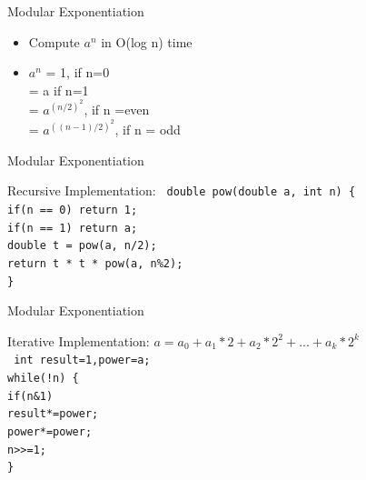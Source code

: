 \documentclass{beamer}
\begin{document}
\begin{frame}[<+->]{Modular Exponentiation}
\begin{itemize}
  \item Compute $a^n$ in O(log n) time
  \item $a^n$ = 1, if n=0\\
	      \hspace{5mm} = a if n=1\\
	      \hspace{5mm} = $a^{{(n/2)}^2}$, if n =even\\
	      \hspace{5mm} = $a^{{((n-1)/2)}^2}$, if n = odd
\end{itemize}
\end{frame}

\begin{frame}{Modular Exponentiation}
  \begin{block}{Recursive Implementation:}
  \tt{
    double pow(double a, int n) \{\\
      \hspace{2mm} if(n == 0) return 1;\\
      \hspace{2mm} if(n == 1) return a;\\
      \hspace{2mm} double t = pow(a, n/2);\\
      \hspace{2mm} return t * t * pow(a, n\%2);\\
    \}
    }
  \end{block}
\end{frame}

\begin{frame}{Modular Exponentiation}
  \begin{block}{Iterative Implementation:}
  \alert{$a = a_0 + a_1*2 + a_2*2^2+...+a_k*2^k$}\\
  \tt{
    int result=1,power=a;\\
    while(!n) \{\\
      \hspace{2mm} if(n\&1)\\
	\hspace{5mm} result*=power;\\
      \hspace{2mm} power*=power;\\
      \hspace{2mm} n>>=1;\\
    \}
    }
  \end{block}
\end{frame}
\end{document}
